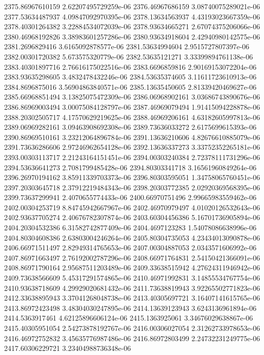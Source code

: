 {2375.86967610159 2.62207495729259e-06
2376.46967686159 3.08740075289021e-06
2377.53634487937 4.09847092970395e-06
2378.13634563937 4.43193023667359e-06
2378.40301264382 3.22884534072039e-06
2378.93634665271 2.67074375206066e-06
2380.46968192826 3.38983601257286e-06
2380.93634918604 2.42940980142575e-06
2381.2696829416 3.6165092878577e-06
2381.53634994604 2.9515727807397e-06
2382.00301720382 5.673575320779e-06
2382.53635121271 3.33399894761138e-06
2383.40301897716 2.76616175022516e-06
2383.6696859816 2.90169153072204e-06
2383.93635298605 3.4832478432246e-06
2384.53635374605 3.11611723610913e-06
2384.8696875016 3.56904863840571e-06
2385.13635450605 2.81339420469627e-06
2385.66968851494 3.13825075472309e-06
2386.06968902161 3.03686743890676e-06
2386.86969003494 3.00075084128797e-06
2387.46969079494 1.91415094228878e-06
2388.20302505717 4.17570629219625e-06
2388.46969206161 4.63182605997813e-06
2389.06969282161 3.09463908692308e-06
2389.73636033272 2.6175699615393e-06
2390.86969510161 3.23212064896784e-06
2391.13636210606 4.82676610885079e-06
2391.73636286606 2.97246962654128e-06
2392.13636337273 3.33752352265181e-06
2393.00303113717 2.21243164151451e-06
2394.00303240384 2.72378111731296e-06
2394.53636641273 2.7081799485428e-06
2394.80303341718 3.16561960849264e-06
2396.26970194162 3.85911339703373e-06
2396.80303595051 1.34758065760451e-06
2397.20303645718 2.37912219484343e-06
2398.20303772385 2.02920369568395e-06
2399.73637299941 2.4070655774433e-06
2400.66970751496 2.99665983559462e-06
2402.00304253719 8.84745942667967e-06
2402.46970979497 4.01020126532643e-06
2402.93637705274 2.40676782307874e-06
2403.60304456386 5.16701736905894e-06
2404.20304532386 6.31582742877409e-06
2404.4697123283 1.54078086638996e-06
2404.80304608386 2.63803004246264e-06
2405.80304735053 4.23434013090878e-06
2406.66971511497 2.82949314765653e-06
2407.00304887053 2.0343571606992e-06
2407.86971663497 2.76192002787296e-06
2408.66971764831 2.54150421366091e-06
2408.86971790164 2.95687511203489e-06
2409.33638515942 4.27624311946942e-06
2409.73638566609 5.45317291574865e-06
2410.46971992831 3.14855534767754e-06
2410.93638718609 4.29929020681432e-06
2411.73638819943 3.92265502771823e-06
2412.33638895943 3.37041268048738e-06
2413.40305697721 3.16407141615765e-06
2413.86972423498 3.48304030247895e-06
2414.13639123943 3.6243136961894e-06
2414.5363917461 4.62125896606124e-06
2415.1363925061 3.34676029638867e-06
2415.40305951054 2.54273878192767e-06
2416.00306027054 2.31262733978653e-06
2416.46972752832 3.45635776987486e-06
2416.86972803499 2.24732231249775e-06
2417.60306229721 3.23404988736348e-06
}
